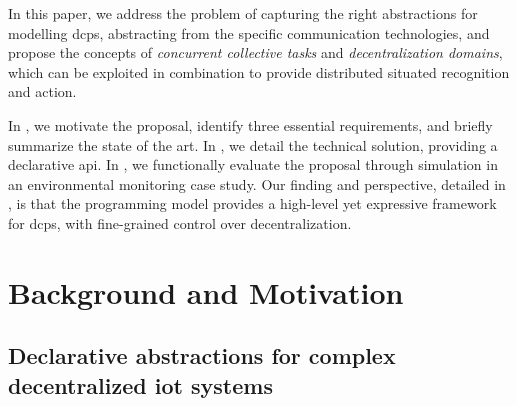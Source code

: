 In this paper, we address the problem of capturing the right abstractions for modelling \acp{dcp},
abstracting from the specific communication technologies, %
%
and propose the concepts of \emph{concurrent collective tasks} and \emph{decentralization domains}, %
 which can be exploited in combination to provide distributed situated recognition and action.
%

In ,
 we motivate the proposal,
 identify three essential requirements,
 and briefly summarize the state of the art.
%
In , we 
 detail the technical solution,
 providing a declarative \ac{api}.
%
In , we functionally evaluate the proposal through simulation
 in an environmental monitoring case study.
%
Our finding and perspective, detailed in ,
 is that the programming model
 provides a high-level yet expressive framework
 for \acp{dcp},
 with fine-grained control over 
 decentralization.

 
 
 
\section{Background and Motivation}\label{sec:motiv}



\subsection{Declarative abstractions for complex decentralized \ac{iot} systems}
\label{declarative-abstractions}


